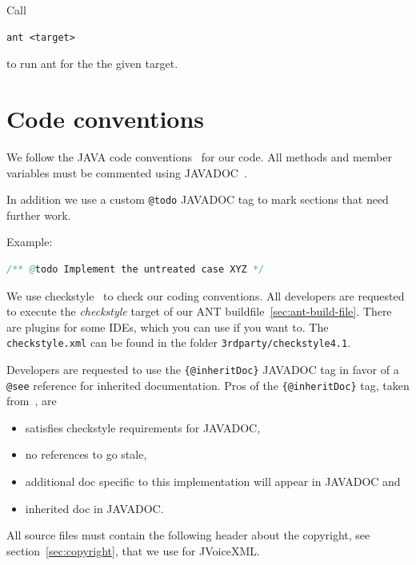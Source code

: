 \documentclass[11pt,a4paper]{article}
\begin{document}
Call
\begin{lstlisting}
ant <target>
\end{lstlisting}
to run ant for the the given target.

\section{Code conventions}
\label{sec:code-conventions}

We follow the JAVA code conventions~\cite{sun:codeconv} for our code. All
methods and member variables must be commented using 
JAVADOC~\cite{sun:javadoc_guidelines}.

In addition we use a custom \texttt{@todo} JAVADOC tag to mark
sections that need further work.

Example:

\begin{lstlisting}[language=Java]
/** @todo Implement the untreated case XYZ */
\end{lstlisting}

We use checkstyle~\cite{checkstyle} to check our coding conventions.
All developers are requested to execute the \emph{checkstyle} target
of our ANT buildfile~\ref{sec:ant-build-file}. 
There are plugins for some IDEs, which you can use if you want to. The
\texttt{checkstyle.xml} can be found in the folder 
\texttt{3rdparty/checkstyle4.1}.

Developers are requested to use the \texttt{\{@inheritDoc\}} JAVADOC
tag in favor of a \texttt{@see} reference for inherited documentation.
Pros of the \texttt{\{@inhe\-rit\-Doc\}} tag, taken 
from~\cite{tauber:inheritdoc}, are
\begin{itemize}
\item satisfies checkstyle requirements for JAVADOC,
\item no references to go stale,
\item additional doc specific to this implementation will appear in JAVADOC and
\item inherited doc in JAVADOC.
\end{itemize}

All source files must contain the following header about the 
copyright, see section~\ref{sec:copyright}, that we use for JVoiceXML.
\end{document}
